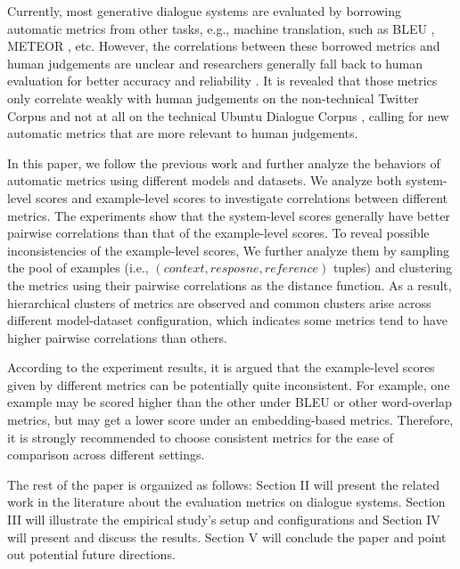 \documentclass[conference]{IEEEtran}
\begin{document}
Currently, most generative dialogue systems are evaluated by borrowing automatic metrics from other tasks, e.g., machine translation, such as BLEU \cite{BLEU}, METEOR \cite{METEOR}, etc.
However, the correlations between these borrowed metrics and human judgements are unclear and researchers generally fall back to human evaluation for better accuracy and reliability \cite{VHRED,Shang}.
It is revealed that those metrics only correlate weakly with human judgements on the non-technical Twitter Corpus and not at all on the technical Ubuntu Dialogue Corpus \cite{HowNot}, calling for new automatic metrics that are more relevant to human judgements.

In this paper, we follow the previous work and further analyze the behaviors of automatic metrics using different models and datasets. 
We analyze both system-level scores and example-level scores to investigate correlations between different metrics.
The experiments show that the system-level scores generally have better pairwise correlations than that of the example-level scores.
To reveal possible inconsistencies of the example-level scores,
We further analyze them by sampling the pool of examples (i.e., $(context, resposne, reference)$ tuples) and clustering the metrics using their pairwise correlations as the distance function.
As a result, hierarchical clusters of metrics are observed and common clusters arise across different model-dataset configuration, which indicates some metrics tend to have higher pairwise correlations than others.

According to the experiment results, it is argued that the example-level scores given by different metrics can be potentially quite inconsistent.
For example, one example may be scored higher than the other under BLEU or other word-overlap metrics, but may get a lower score under an embedding-based metrics.
Therefore, it is strongly recommended to choose consistent metrics for the ease of comparison across different settings.

The rest of the paper is organized as follows: Section II will present the related work in the literature about the evaluation metrics on dialogue systems.
Section III will illustrate the empirical study's setup and configurations and Section IV will present and discuss the results.
Section V will conclude the paper and point out potential future directions.
\end{document}

